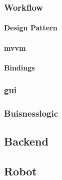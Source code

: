 \subsubsection{Workflow} %

\paragraph{Design Pattern}
\paragraph{\acrfull{mvvm}}
\paragraph{Bindings}

\subsubsection{\acrfull{gui}} %

\subsubsection{Buisnesslogic} %

\subsection{Backend}

\subsection{Robot}

